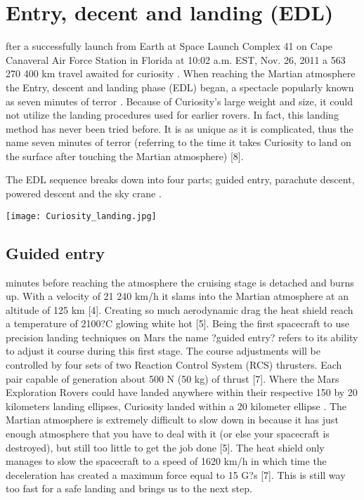 \section*{Entry, decent and landing (EDL)}
fter a successfully launch from Earth at Space Launch Complex 41 on Cape Canaveral Air Force Station in Florida at 10:02 a.m. EST, Nov. 26, 2011 a 563 270 400 km travel awaited for curiosity \cite{MissionTimeline} \cite{CNNCuriosity}.
When reaching the Martian atmosphere the Entry, descent and landing phase (EDL) began, a spectacle popularly known as seven minutes of terror \cite{CNNCuriosity}.
Because of Curiosity's large weight and size, it could not utilize the landing procedures used for earlier rovers.
In fact, this landing method has never been tried before.
It is as unique as it is complicated, thus the name seven minutes of terror (referring to the time it takes Curiosity to land on the surface after touching the Martian atmosphere) [8].

The EDL sequence breaks down into four parts; guided entry, parachute descent, powered descent and the sky crane \cite{NASALanding}.


\begin{center}
\texttt{[image: Curiosity\_landing.jpg]}
\label{fig:Curiosity_landing}
\end{center}


\subsection*{Guided entry}
 minutes before reaching the atmosphere the cruising stage is detached and burns up.
With a velocity of 21 240 km/h it slams into the Martian atmosphere at an altitude of 125 km [4]. Creating so much aerodynamic drag the heat shield reach a temperature of 2100?C glowing white hot \cite{NASALanding} [5]. Being the first spacecraft to use precision landing techniques on Mars the name ?guided entry? refers to its ability to adjust it course during this first stage. The course adjustments will be controlled by four sets of two Reaction Control System (RCS) thrusters. Each pair capable of generation about 500 N (50 kg) of thrust [7]. Where the Mars Exploration Rovers could have landed anywhere within their respective 150 by 20 kilometers landing ellipses, Curiosity landed within a 20 kilometer ellipse \cite{NASALanding}.
The Martian atmosphere is extremely difficult to slow down in because it has just enough atmosphere that you have to deal with it (or else your spacecraft is destroyed), but still too little to get the job done [5]. The heat shield only manages to slow the spacecraft to a speed of 1620 km/h in which time the deceleration has created a maximum force equal to 15 G?s \cite{NASALanding} [7]. This is still way too fast for a safe landing and brings us to the next step.

